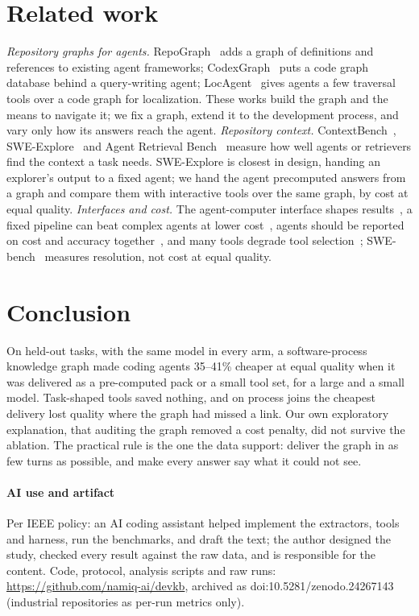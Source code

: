 \documentclass[conference]{IEEEtran}
\newif\ifanon
\begin{document}
\section{Related work}\label{sec:related}
\emph{Repository graphs for agents.} RepoGraph~\cite{ouyang2025repograph} adds a graph of definitions and references
to existing agent frameworks; CodexGraph~\cite{liu2024codexgraph} puts a code graph database behind a query-writing
agent; LocAgent~\cite{chen2025locagent} gives agents a few traversal tools over a code graph for localization. These
works build the graph and the means to navigate it; we fix a graph, extend it to the development process, and vary only
how its answers reach the agent.
\emph{Repository context.} ContextBench~\cite{li2026contextbench}, SWE-Explore~\cite{zhang2026sweexplore} and Agent
Retrieval Bench~\cite{qin2026arb} measure how well agents or retrievers find the context a task needs. SWE-Explore is
closest in design, handing an explorer's output to a fixed agent; we hand the agent precomputed answers from a graph and
compare them with interactive tools over the same graph, by cost at equal quality.
\emph{Interfaces and cost.} The agent-computer interface shapes results~\cite{yang2024sweagent}, a fixed pipeline can
beat complex agents at lower cost~\cite{xia2025agentless}, agents should be reported on cost and accuracy
together~\cite{kapoor2025agents}, and many tools degrade tool selection~\cite{gan2025ragmcp}; SWE-bench~\cite{jimenez2024swebench}
measures resolution, not cost at equal quality.

\section{Conclusion}
On held-out tasks, with the same model in every arm, a software-process knowledge graph made coding agents 35--41\%
cheaper at equal quality when it was delivered as a pre-computed pack or a small tool set, for a large and a small
model. Task-shaped tools saved nothing, and on process joins the cheapest delivery lost quality where the graph had
missed a link. Our own exploratory explanation, that auditing the graph removed a cost penalty, did not survive the
ablation. The practical rule is the one the data support: deliver the graph in as few turns as possible, and make
every answer say what it could not see.

\paragraph*{AI use and artifact} Per IEEE policy: an AI coding assistant helped implement the extractors, tools and
harness, run the benchmarks, and draft the text; the author designed the study, checked every result against the raw
data, and is responsible for the content. \ifanon An anonymised artifact (code, tasks with truth, raw runs, analysis,
pre-registration) is available to reviewers.\else Code, protocol, analysis scripts and raw runs:
\url{https://github.com/namiq-ai/devkb}, archived as doi:10.5281/zenodo.24267143 (industrial repositories as per-run metrics only).\fi



\end{document}
